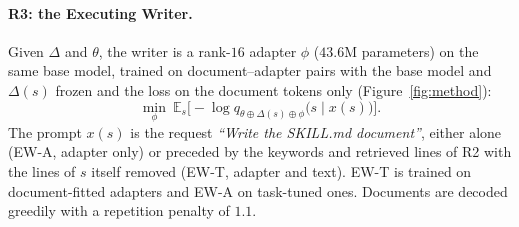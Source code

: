 \documentclass[11pt]{article}
\newcommand{\EWT}{\textsc{EW-T}}
\newcommand{\EWA}{\textsc{EW-A}}
\begin{document}
\paragraph{R3: the Executing Writer.} Given $\Delta$ and $\theta$, the writer is a rank-$16$ adapter $\phi$ ($43.6$M parameters) on the same base
model, trained on document--adapter pairs with the base model and $\Delta(s)$ frozen and the loss on the document tokens only (Figure~\ref{fig:method}):
\[
\min_{\phi}\ \mathbb E_{s}\Big[-\log q_{\theta\oplus\Delta(s)\oplus\phi}\big(s\mid x(s)\big)\Big].
\]
The prompt $x(s)$ is the request \emph{``Write the SKILL.md document''}, either alone (\EWA{}, adapter only) or preceded by the keywords and
retrieved lines of R2 with the lines of $s$ itself removed (\EWT{}, adapter and text). \EWT{} is trained on document-fitted adapters and \EWA{}
on task-tuned ones. Documents are decoded greedily with a repetition penalty of $1.1$.
\end{document}

